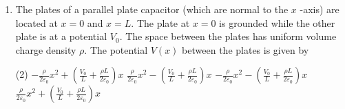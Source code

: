 \begin{enumerate}[label=\color{ocre}\textbf{\arabic*.}]
\begin{answer}
	\end{answer}
	\item The plates of a parallel plate capacitor (which are normal to the $x$ -axis) are located at $x=0$
	and $x=L .$ The plate at $x=0$ is grounded while the other plate is at a potential $V_{0} .$ The
	space between the plates has uniform volume charge density $\rho .$ The potential $V(x)$
	between the plates is given by
	\begin{tasks}(2)
		\task[\textbf{a.}]$-\frac{\rho}{2 \varepsilon_{0}} x^{2}+\left(\frac{V_{0}}{L}+\frac{\rho L}{2 \varepsilon_{0}}\right) x$  
		\task[\textbf{b.}] $\frac{\rho}{2 \varepsilon_{0}} x^{2}-\left(\frac{V_{0}}{L}+\frac{\rho L}{2 \varepsilon_{0}}\right) x$
		\task[\textbf{c.}]$-\frac{\rho}{2 \varepsilon_{0}} x^{2}-\left(\frac{V_{0}}{L}+\frac{\rho L}{2 \varepsilon_{0}}\right) x$ 
		\task[\textbf{d.}]$\frac{\rho}{2 \varepsilon_{0}} x^{2}+\left(\frac{V_{0}}{L}+\frac{\rho L}{2 \varepsilon_{0}}\right) x$
		
	\end{tasks}
	\begin{answer}
		

\end{answer}
\end{enumerate}
